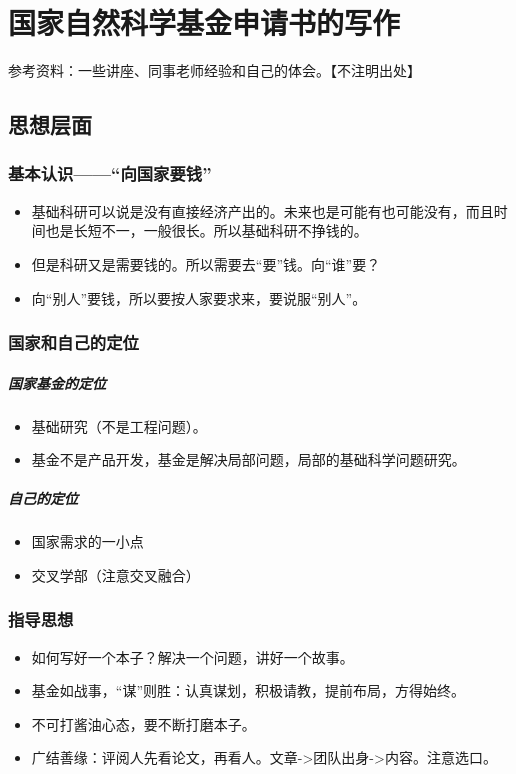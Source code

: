 \chapter{国家自然科学基金申请书的写作}
参考资料：一些讲座、同事老师经验和自己的体会。【不注明出处】
\section{思想层面}
\subsection{基本认识——“向国家要钱”}
\begin{itemize}
\item 基础科研可以说是没有直接经济产出的。未来也是可能有也可能没有，而且时间也是长短不一，一般很长。所以基础科研不挣钱的。
\item 但是科研又是需要钱的。所以需要去“要”钱。向“谁”要？
\item 向“别人”要钱，所以要按人家要求来，要说服“别人”。
\end{itemize}


\subsection{国家和自己的定位}
\paragraph{国家基金的定位}
\begin{itemize}
\item 基础研究（不是工程问题）。
\item 基金不是产品开发，基金是解决局部问题，局部的基础科学问题研究。
\end{itemize}

\paragraph{自己的定位}
\begin{itemize}
\item 国家需求的一小点
\item 交叉学部（注意交叉融合）
\end{itemize}


\subsection{指导思想}
\begin{itemize}
\item 如何写好一个本子？解决一个问题，讲好一个故事。

\item 基金如战事，“谋”则胜：认真谋划，积极请教，提前布局，方得始终。

\item 不可打酱油心态，要不断打磨本子。

\item 广结善缘：评阅人先看论文，再看人。文章->团队出身->内容。注意选口。
\end{itemize}


